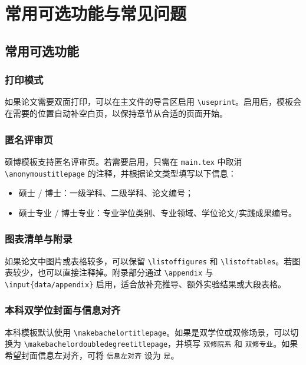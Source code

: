 
\chapter{常用可选功能与常见问题}

\section{常用可选功能}

\subsection{打印模式}

如果论文需要双面打印，可以在主文件的导言区启用 \texttt{\textbackslash useprint}。启用后，模板会在需要的位置自动补空白页，以保持章节从合适的页面开始。

\subsection{匿名评审页}

硕博模板支持匿名评审页。若需要启用，只需在 \texttt{main.tex} 中取消 \texttt{\textbackslash anonymoustitlepage} 的注释，并根据论文类型填写以下信息：

\begin{itemize}
    \item 硕士 / 博士：一级学科、二级学科、论文编号；
    \item 硕士专业 / 博士专业：专业学位类别、专业领域、学位论文/实践成果编号。
\end{itemize}

\subsection{图表清单与附录}

如果论文中图片或表格较多，可以保留 \texttt{\textbackslash listoffigures} 和 \texttt{\textbackslash listoftables}。若图表较少，也可以直接注释掉。附录部分通过 \texttt{\textbackslash appendix} 与 \texttt{\textbackslash input\{data/appendix\}} 启用，适合放补充推导、额外实验结果或大段表格。

\subsection{本科双学位封面与信息对齐}

本科模板默认使用 \texttt{\textbackslash makebachelortitlepage}。如果是双学位或双修场景，可以切换为 \texttt{\textbackslash makebachelordoubledegreetitlepage}，并填写 \texttt{双修院系} 和 \texttt{双修专业}。如果希望封面信息左对齐，可将 \texttt{信息左对齐} 设为 \texttt{是}。

